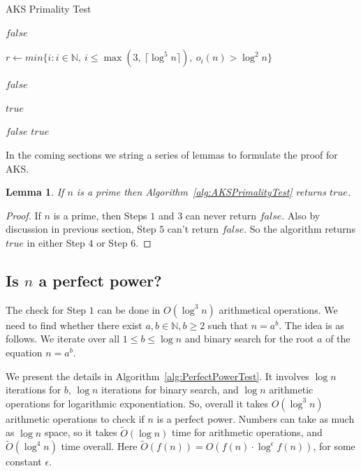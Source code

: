 \documentclass[11pt]{article}
\newtheorem{lemma}[theorem]{Lemma}
\begin{document}
\begin{algorithm}
\caption{AKS Primality Test}
\label{alg:AKSPrimalityTest}
\begin{algorithmic}

	\State \Return $false$  
\EndIf

\State $r \gets min \{i: i \in \mathbb{N},\ i \leq \max(3,\ \lceil \log^5 n \rceil),\ o_i(n) > \log^2 n \}$ 

		\State \Return $false$  
	\EndIf
\EndFor

	\Return $true$  
\EndIf

		\State \Return $false$  
	\EndIf
\EndFor
\State \Return $true$ 
\EndProcedure
\end{algorithmic}
\end{algorithm}


In the coming sections we string a series of lemmas to formulate the proof for AKS.

\begin{lemma}
\label{lemma:AKSLemma1}
If $n$ is a prime then Algorithm~\ref{alg:AKSPrimalityTest} returns $true$.
\end{lemma}
 
\begin{proof}
If $n$ is a prime, then Steps $1$ and $3$ can never return $false$. Also by discussion in previous section, Step $5$ can't return $false$. So the algorithm returns $true$ in either Step $4$ or Step $6$.
\end{proof}

\subsection{Is $n$ a perfect power?}
The check for Step $1$ can be done in $O(\log^3 n)$ arithmetical operations. We need to find whether there exist $a, b \in \mathbb{N}, b \geq 2$ such that $n = a^b$. The idea is as follows. We iterate over all $1 \leq b \leq \log n$ and binary search for the root $a$ of the equation $n = a^b$. 

We present the details in Algorithm~\ref{alg:PerfectPowerTest}. It involves $\log n$ iterations for $b$, $\log n$ iterations for binary search, and $\log n$ arithmetic operations for logarithmic exponentiation. So, overall it takes $O(\log^3 n)$ arithmetic operations to check if $n$ is a perfect power. Numbers can take as much as $\log n$ space, so it takes $\tilde O(\log n)$ time for arithmetic operations, and $\tilde O(\log^4 n)$ time overall. Here $\tilde O(f(n)) = O(f(n) \cdot \log^{\epsilon} f(n))$, for some constant $\epsilon$.
\end{document}
